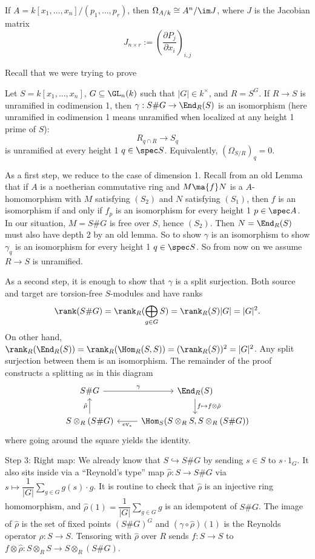 \begin{rem}
If $A= k[x_1,\ldots,x_n]/(p_1,\ldots,p_r)$, then $\Omega_{A/k} \cong A^n/\im J$, where $J$ is the Jacobian matrix
	\[
	J_{n \times r}:= \left( \dfrac{\partial P_j}{\partial x_i} \right)_{i,j}
	\]
\end{rem}



Recall that we were trying to prove 

\begin{thm}[Auslander, 1962]
Let $S= k[x_1,\ldots,x_n]$, $G \subseteq \GL_n(k)$ such that $|G| \in k^\times$, and $R= S^G$. If $R \to S$ is unramified in codimension 1, then $\gamma: S\#G \to \End_R(S)$ is an isomorphism (here unramified in codimension 1 means unramified when localized at any height 1 prime of $S$):
	\[
	R_{q \cap R} \to S_q
	\] 
is unramified at every height 1 $q \in \spec S$. Equivalently, $(\Omega_{S/R})_q=0$. 
\end{thm}

\pf As a first step, we reduce to the case of dimension 1. Recall from an old Lemma that if $A$ is a noetherian commutative ring and $M \ma{f} N$ is a $A$-homomorphism with $M$ satisfying $(S_2)$ and $N$ satisfying $(S_1)$, then $f$ is an isomorphism if and only if $f_p$ is an isomorphism for every height 1 $p \in \spec A$. In our situation, $M= S\#G$ is free over $S$, hence $(S_2)$. Then $N= \End_R(S)$ must also have depth 2 by an old lemma. So to show $\gamma$ is an isomorphism to show $\gamma_q$ is an isomorphism for every height 1 $q \in \spec S$. So from now on we assume $R \to S$ is unramified. 


As a second step, it is enough to show that $\gamma$ is a split surjection. Both source and target are torsion-free $S$-modules and have ranks 
	\[
	\rank (S\#G) = \rank_R( \bigoplus_{g \in G} S) = \rank_R(S) |G| = |G|^2.
	\] 
On other hand, $\rank_R(\End_R(S))= \rank_R(\Hom_R(S,S))= (\rank_R(S))^2= |G|^2$. Any split surjection between them is an isomorphism. The remainder of the proof constructs a splitting as in this diagram
	\[
	\begin{tikzcd}
	S\#G \arrow{r}{\gamma} & \End_R(S) \arrow{d}{f \mapsto f \otimes \hat{\rho}} \\
	S \otimes_R (S\#G) \arrow{u}{\tilde{\mu}} & \Hom_S(S \otimes_R S, S \otimes_R (S\#G)) \arrow{l}{\text{ev}_\epsilon}
	\end{tikzcd}
	\]
where going around the square yields the identity. 

Step 3: Right map: We already know that $S \hookrightarrow S\#G$ by sending $s \in S$ to $s \cdot 1_G$. It also sits inside via a ``Reynold's type'' map $\hat{\rho}: S \to S\#G$ via $s \mapsto \dfrac{1}{|G|} \sum_{g \in G} g(s) \cdot g$. It is routine to check that $\hat{\rho}$ is an injective ring homomorphism, and $\hat{\rho}(1)= \dfrac{1}{|G|} \sum_{g \in G} g$ is an idempotent of $S\#G$. The image of $\hat{\rho}$ is the set of fixed points $(S\#G)^G$ and $(\gamma \circ \hat{\rho})(1)$ is the Reynolds operator $\rho: S \to S$. Tensoring with $\hat{\rho}$ over $R$ sends $f: S \to S$ to $f \otimes \hat{\rho}: S \otimes_R S \to S \otimes_R (S\#G)$. 


